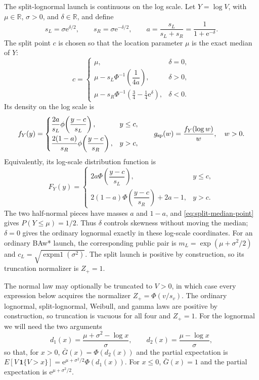 \documentclass[12pt]{article}
\newcommand{\PhiN}{\Phi}
\newcommand{\phiN}{\phi}
\newcommand{\Gbar}{\bar{G}}
\newcommand{\e}{\mathrm{e}}
\theoremstyle{remark}
\begin{document}
The split-lognormal launch is continuous on the log scale. Let $Y=\log V$, with $\mu\in\mathbb{R}$, $\sigma>0$, and $\delta\in\mathbb{R}$, and define
\begin{equation}
  s_L=\sigma\e^{\delta/2},\qquad
  s_R=\sigma\e^{-\delta/2},\qquad
  a=\frac{s_L}{s_L+s_R}=\frac{1}{1+\e^{-\delta}}.
  \label{eq:split-shape}
\end{equation}
The split point $c$ is chosen so that the location parameter $\mu$ is the exact median of $Y$:
\begin{equation}
  c=\begin{cases}
    \mu, & \delta=0,\\[2pt]
    \mu-s_L\PhiN^{-1}\!\left(\dfrac{1}{4a}\right), & \delta>0,\\[8pt]
    \mu-s_R\PhiN^{-1}\!\left(\frac{3}{4}-\frac{1}{4}\e^{\delta}\right), & \delta<0.
  \end{cases}
  \label{eq:split-median-point}
\end{equation}
Its density on the log scale is
\begin{equation}
 f_Y(y)=
 \begin{cases}
   \dfrac{2a}{s_L}\phiN\!\left(\dfrac{y-c}{s_L}\right), & y\le c,\\[8pt]
   \dfrac{2(1-a)}{s_R}\phiN\!\left(\dfrac{y-c}{s_R}\right), & y>c,
 \end{cases}
 \qquad
 g_{\rm sp}(w)=\frac{f_Y(\log w)}{w},\quad w>0.
 \label{eq:split-density}
\end{equation}
Equivalently, its log-scale distribution function is
\begin{equation}
 F_Y(y)=
 \begin{cases}
   2a\PhiN\!\left(\dfrac{y-c}{s_L}\right), & y\le c,\\[8pt]
   2(1-a)\PhiN\!\left(\dfrac{y-c}{s_R}\right)+2a-1, & y>c.
 \end{cases}
 \label{eq:split-cdf}
\end{equation}
The two half-normal pieces have masses $a$ and $1-a$, and
\eqref{eq:split-median-point} gives $P(Y\le\mu)=1/2$. Thus $\delta$ controls
skewness without moving the median; $\delta=0$ gives the ordinary lognormal exactly in these log-scale coordinates. For an ordinary BAw* launch, the corresponding public pair is $m_L=\exp(\mu+\sigma^2/2)$ and $c_L=\sqrt{\operatorname{expm1}(\sigma^2)}$. The split launch is positive by construction, so its truncation normalizer is $Z_+=1$.

The normal law may optionally be truncated to $V > 0$, in which case every expression below acquires the normalizer $Z_+ = \PhiN(v/s_v)$. The ordinary lognormal, split-lognormal, Weibull, and gamma laws are positive by construction, so truncation is vacuous for all four and $Z_+ = 1$. For the lognormal we will need the two arguments
\begin{equation}
  d_1(x) = \frac{\mu + \sigma^2 - \log x}{\sigma},
  \qquad
  d_2(x) = \frac{\mu - \log x}{\sigma},
  \label{eq:d1d2}
\end{equation}
so that, for $x>0$, $\Gbar(x) = \PhiN(d_2(x))$ and the partial expectation is $E[V\,\mathbf{1}\{V>x\}] = \e^{\mu+\sigma^2/2}\PhiN(d_1(x))$. For $x\le0$, $\Gbar(x)=1$ and the partial expectation is $\e^{\mu+\sigma^2/2}$.
\end{document}
